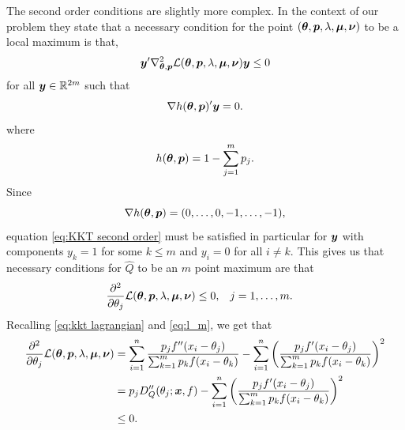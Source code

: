 	The second order conditions are slightly more complex. In the context of our problem they state \cite[Proposition 3.3.1]{Bertsekas1995-mh} that a necessary condition for the point $({\bm{{\theta}}}, {\bm{{p}}}, \lambda, {\bm{{\mu}}}, {\bm{{\nu}}})$ to be a local maximum is that,
	\begin{equation}
		{\bm{{y}}}' \nabla^2_{{\bm{{\theta}}}, {\bm{{p}}}} \mathcal{L}({\bm{{\theta}}}, {\bm{{p}}}, \lambda, {\bm{{\mu}}}, {\bm{{\nu}}}) {\bm{{y}}} \leq 0
		\label{eq:KKT second order}
	\end{equation}
	for all ${\bm{{y}}} \in \mathbb{R}^{2m}$ such that
	\begin{equation}
		\nabla h({\bm{{\theta}}}, {\bm{{p}}})' {\bm{{y}}} = 0.
	\end{equation}
	where
	\begin{equation}
		h({\bm{{\theta}}}, {\bm{{p}}}) = 1 - \sum_{j = 1}^m p_j.
	\end{equation}
	Since 
	\begin{equation}
		\nabla h({\bm{{\theta}}}, {\bm{{p}}}) = (0, \dots, 0, -1, \dots, -1),
	\end{equation}{}
	equation \eqref{eq:KKT second order} must be satisfied in particular for ${\bm{{y}}}$ with components $y_k = 1$ for some $k \leq m$ and $y_i  = 0$ for all $i \neq k$. This gives us that necessary conditions for $\hat{Q}$ to be an $m$ point maximum are that
	\begin{align}
		\frac{\partial^2}{\partial \theta_j} \mathcal{L}({\bm{{\theta}}}, {\bm{{p}}}, \lambda, {\bm{{\mu}}}, {\bm{{\nu}}}) &\leq 0, && j = 1, \dots, m.
	\end{align}
	Recalling \eqref{eq:kkt lagrangian} and \eqref{eq:l_m}, we get that
	\begin{align}
		\frac{\partial^2}{\partial \theta_j} \mathcal{L}({\bm{{\theta}}}, {\bm{{p}}}, \lambda, {\bm{{\mu}}}, {\bm{{\nu}}}) &= \sum_{i = 1}^n \frac{p_j f''(x_i - \theta_j)}{\sum_{k = 1}^m p_k f(x_i - \theta_k)} - \sum_{i = 1}^n \left(\frac{p_j f'(x_i - \theta_j)}{\sum_{k = 1}^m p_k f(x_i - \theta_k)}\right)^2 \\
		&= p_j D_Q''(\theta_j;{\bm{{x}}}, f) - \sum_{i = 1}^n \left(\frac{p_j f'(x_i - \theta_j)}{\sum_{k = 1}^m p_k f(x_i - \theta_k)}\right)^2 \\
		&\leq 0.
	\end{align}
